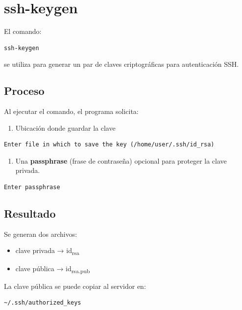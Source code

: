 \documentclass[11pt, letterpaper]{article}
\begin{document}
\section{ssh-keygen}
\label{sec:org853a0c3}

El comando:

\begin{verbatim}
ssh-keygen
\end{verbatim}

se utiliza para generar un par de claves criptográficas para autenticación SSH.
\subsection{Proceso}
\label{sec:org6cabc20}

Al ejecutar el comando, el programa solicita:

\begin{enumerate}
\item Ubicación donde guardar la clave
\end{enumerate}

\begin{verbatim}
Enter file in which to save the key (/home/user/.ssh/id_rsa)
\end{verbatim}

\begin{enumerate}
\item Una \textbf{passphrase} (frase de contraseña) opcional para proteger la clave privada.
\end{enumerate}

\begin{verbatim}
Enter passphrase
\end{verbatim}
\subsection{Resultado}
\label{sec:org6017813}

Se generan dos archivos:

\begin{itemize}
\item clave privada → id\textsubscript{rsa}
\item clave pública → id\textsubscript{rsa.pub}
\end{itemize}

La clave pública se puede copiar al servidor en:

\begin{verbatim}
~/.ssh/authorized_keys
\end{verbatim}
\end{document}
